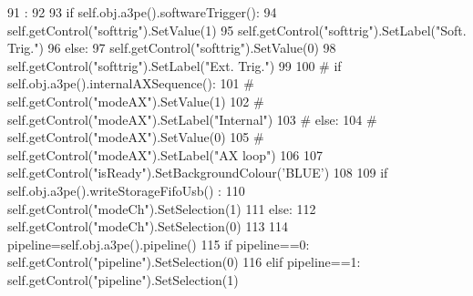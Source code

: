 \begin{DoxyCode}
91                     :
92         
93         if self.obj.a3pe().softwareTrigger():
94             self.getControl("softtrig").SetValue(1)
95             self.getControl("softtrig").SetLabel("Soft. Trig.")
96         else:
97             self.getControl("softtrig").SetValue(0)
98             self.getControl("softtrig").SetLabel("Ext. Trig.")
99             
100  #       if self.obj.a3pe().internalAXSequence():    
101  #           self.getControl("modeAX").SetValue(1)
102  #           self.getControl("modeAX").SetLabel("Internal")
103  #       else:   
104  #           self.getControl("modeAX").SetValue(0)            
105  #           self.getControl("modeAX").SetLabel("AX loop")
106 
107         self.getControl("isReady").SetBackgroundColour('BLUE')
108 
109         if self.obj.a3pe().writeStorageFifoUsb() :
110             self.getControl("modeCh").SetSelection(1)
111         else:
112             self.getControl("modeCh").SetSelection(0)
113             
114         pipeline=self.obj.a3pe().pipeline()
115         if pipeline==0: self.getControl("pipeline").SetSelection(0)
116         elif pipeline==1: self.getControl("pipeline").SetSelection(1)            
      

\end{DoxyCode}

